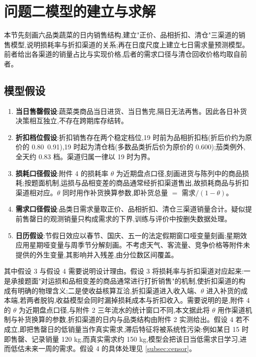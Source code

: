 \section{问题二模型的建立与求解}

本节先刻画六品类蔬菜的日内销售结构,建立"正价、品相折扣、清仓"三渠道的销售模型,说明损耗率与折扣渠道的关系;再在日度尺度上建立七日需求量预测模型。前者给出各渠道的销量占比与实现价格,后者的需求口径与清仓回收价格均取自前者。

\subsection{模型假设}

\begin{enumerate}
  \item \textbf{当日售罄假设}:蔬菜类商品当日进货、当日售完,隔日无法再售。因此各日补货决策相互独立,不存在跨期库存结转。
  \item \textbf{折扣档位假设}:折扣销售存在两个稳定档位,19 时前为品相折扣档(折后价约为原价的 0.80~0.91),19 时起为清仓档(多数品类折后价为原价的 0.600);茄类例外,全天约 0.83 档。渠道归属一律以 19 时为界。
  \item \textbf{损耗口径假设}:附件 4 的损耗率 $\theta$ 为近期盘点口径,刻画进货与陈列中的商品损耗;按题面机制,运损与品相变差的商品通常经折扣渠道售出,故损耗商品与折扣渠道相对应。$\theta$ 同时用作补货换算参数,即补货总量 $=$ 需求$/ (1-\theta)$。
  \item \textbf{需求口径假设}:品类日需求量取正价、品相折扣、清仓三渠道销量合计。疑似提前售罄日的观测销量只构成需求的下界,训练与评价中按删失数据处理。
  \item \textbf{日历假设}:节假日效应以春节、国庆、五一的法定假期窗口哑变量刻画;星期效应用星期哑变量与周季节分解刻画。不考虑天气、客流量、竞争价格等附件未提供的外生变量,其影响并入残差,由分位数区间覆盖。
\end{enumerate}

其中假设 3 与假设 4 需要说明设计理由。假设 3 将损耗率与折扣渠道对应起来:一是承接题面"对运损和品相变差的商品通常进行打折销售"的机制,使折扣渠道的构成有明确的物理含义;二是使收益核算互洽,折扣渠道进入收入端、$\theta$ 进入补货的成本端,若两者脱钩,收益模型会同时漏掉损耗成本与折扣收入。需要说明的是,附件 4 的 $\theta$ 为近期盘点口径,与附件 2 三年流水的统计窗口不同,本文据此将 $\theta$ 用作渠道机制与补货换算的参数,折扣渠道的日内与品类结构由附件 2 实测给出。假设 4 若不成立,即把售罄日的低销量当作真实需求,滞后特征将被系统性污染:例如某日 15 时即售罄、记录销量 120 kg,而真实需求约 150 kg,模型会把该日当低需求日学习,进而低估未来一周的需求。假设 4 的具体处理见 \ref{subsec:censor}。

